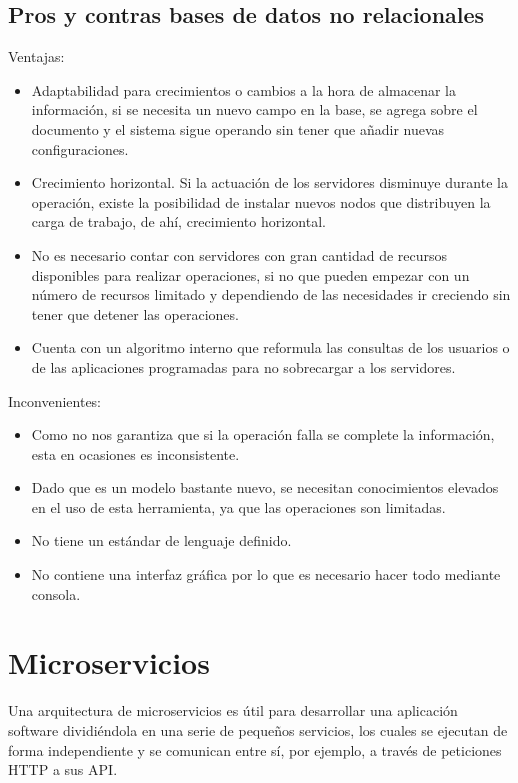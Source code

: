 \documentclass[12pt]{report} %
\begin{document}
	\subsection{Pros y contras bases de datos no relacionales}
		Ventajas:
	\begin{itemize}
		\item Adaptabilidad para crecimientos o cambios a la hora de almacenar la información, si se necesita un nuevo campo en la base, se agrega sobre el documento y el sistema sigue operando sin tener que añadir nuevas configuraciones.
		\item Crecimiento horizontal. Si la actuación de los servidores disminuye durante la operación, existe la posibilidad de instalar nuevos nodos que distribuyen la carga de trabajo, de ahí, crecimiento horizontal.
		\item No es necesario contar con servidores con gran cantidad de recursos disponibles para realizar operaciones, si no que pueden empezar con un número de recursos limitado y dependiendo de las necesidades ir creciendo sin tener que detener las operaciones.
		\item Cuenta con un algoritmo interno que reformula las consultas de los usuarios o de las aplicaciones programadas para no sobrecargar a los servidores.
	\end{itemize}
	Inconvenientes:
	\begin{itemize}
		\item Como no nos garantiza que si la operación falla se complete la información, esta en ocasiones es inconsistente.
		\item Dado que es un modelo bastante nuevo, se necesitan conocimientos elevados en el uso de esta herramienta, ya que las operaciones son limitadas.
		\item No tiene un estándar de lenguaje definido.
		\item No contiene una interfaz gráfica por lo que es necesario hacer todo mediante consola.
	\end{itemize}

\section{Microservicios}

Una arquitectura de microservicios es útil para desarrollar una aplicación software dividiéndola en una serie de pequeños servicios, los cuales se ejecutan de forma independiente y se comunican entre sí, por ejemplo, a través de peticiones HTTP a sus API.
\end{document}
